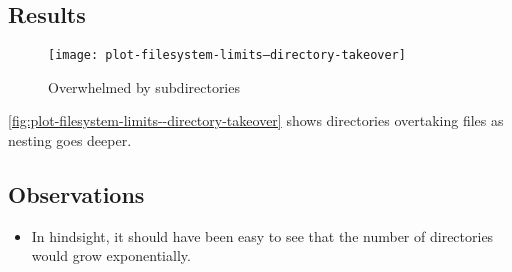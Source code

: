 \subsection{Results}

\begin{figure}[]
  \caption{Overwhelmed by subdirectories}
  \label{fig:plot-filesystem-limits--directory-takeover}
  \centering
    \texttt{[image: plot-filesystem-limits--directory-takeover]}
\end{figure}

\autoref{fig:plot-filesystem-limits--directory-takeover} shows directories
overtaking files as nesting goes deeper.

\subsection{Observations}

\begin{itemize}

  \item In hindsight, it should have been easy to see that the number of
    directories would grow exponentially.

\end{itemize}
